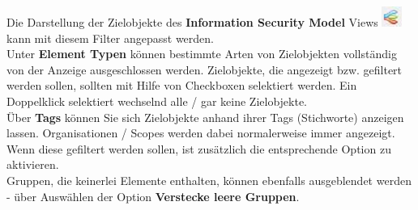 \documentclass[a4paper,10pt]{book}
\begin{document}
Die Darstellung der Zielobjekte des \textbf{Information Security Model} Views \includegraphics[height=2ex]{Icon/Informationssicherheitsmodell.png} kann
mit diesem Filter angepasst werden.
\newline\\
Unter \textbf{Element Typen} können bestimmte Arten von Zielobjekten vollständig von der Anzeige ausgeschlossen werden. Zielobjekte,
die angezeigt bzw. gefiltert werden sollen, sollten mit Hilfe von Checkboxen selektiert werden. Ein Doppelklick selektiert
wechselnd alle / gar keine Zielobjekte.
\newline\\
Über \textbf{Tags} können Sie sich Zielobjekte anhand ihrer Tags (Stichworte) anzeigen lassen. Organisationen / Scopes werden dabei normalerweise
immer angezeigt. Wenn diese gefiltert werden sollen, ist zusätzlich die entsprechende Option zu aktivieren.
\newline\\
Gruppen, die keinerlei Elemente enthalten, können ebenfalls ausgeblendet werden - über Auswählen der Option \textbf{Verstecke leere Gruppen}.
\end{document}
